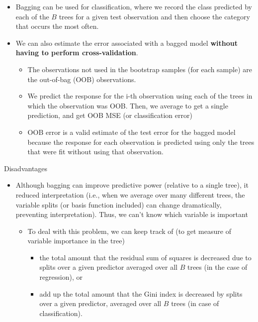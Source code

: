 \documentclass[
]{book}
\begin{document}
\begin{itemize}
\item
  Bagging can be used for classification, where we record the class predicted by each of the \(B\) trees for a given test observation and then choose the category that occurs the most often.
\item
  We can also estimate the error associated with a bagged model \textbf{without having to perform cross-validation}.

  \begin{itemize}
  \item
    The observations not used in the bootstrap samples (for each sample) are the out-of-bag (OOB) observations.
  \item
    We predict the response for the i-th observation using each of the trees in which the observation was OOB. Then, we average to get a single prediction, and get OOB MSE (or classification error)
  \item
    OOB error is a valid estimate of the test error for the bagged model because the response for each observation is predicted using only the trees that were fit without using that observation.
  \end{itemize}
\end{itemize}

Disadvantages

\begin{itemize}
\item
  Although bagging can improve predictive power (relative to a single tree), it reduced interpretation (i.e., when we average over many different trees, the variable splits (or basis function included) can change dramatically, preventing interpretation). Thus, we can't know which variable is important

  \begin{itemize}
  \item
    To deal with this problem, we can keep track of (to get measure of variable importance in the tree)

    \begin{itemize}
    \item
      the total amount that the residual sum of squares is decreased due to splits over a given predictor averaged over all \(B\) trees (in the case of regression), or
    \item
      add up the total amount that the Gini index is decreased by splits over a given predictor, averaged over all \(B\) trees (in case of classification).
    \end{itemize}
  \end{itemize}
\end{itemize}
\end{document}

